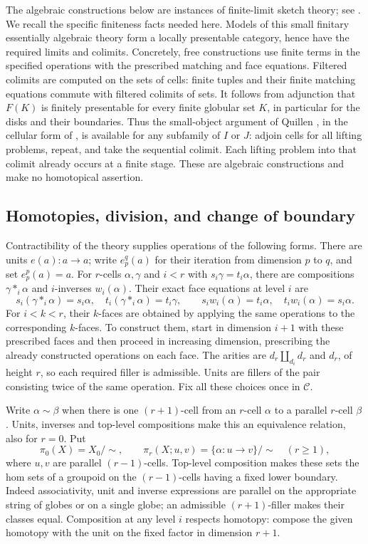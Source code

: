 \documentclass[11pt,letterpaper]{article}
\numberwithin{equation}{section}
\theoremstyle{plain}
\theoremstyle{definition}
\theoremstyle{remark}
\begin{document}
The algebraic constructions below are instances of finite-limit sketch
theory; see \cite[Section~4.4, Theorems~1, 2 and~4]{BarrWells1985}.
We recall the specific finiteness facts needed here.  Models of this small
finitary essentially algebraic theory form a locally presentable
category, hence have the required limits and colimits.  Concretely,
free constructions use finite terms in the specified operations with
the prescribed matching and face equations.  Filtered colimits are
computed on the sets of cells: finite tuples and their finite matching
equations commute with filtered colimits of sets.  It follows from
adjunction that $F(K)$ is finitely presentable for every finite globular
set $K$, in particular for the disks and their boundaries.  Thus the
small-object argument of Quillen \cite{Quillen1967}, in the cellular
form of \cite[Theorem~2.1.14 and Corollary~2.1.15]{Hovey1999}, is
available for any subfamily of $I$ or $J$: adjoin cells for all lifting
problems, repeat, and take the
sequential colimit.  Each lifting problem into that colimit already
occurs at a finite stage.  These are algebraic constructions and make
no homotopical assertion.

\subsection{Homotopies, division, and change of boundary}

Contractibility of the theory supplies operations of the following
forms.  There are units $e(a):a\to a$; write $e_p^q(a)$ for their
iteration from dimension $p$ to $q$, and set $e_p^p(a)=a$.  For
$r$-cells $\alpha,\gamma$ and $i<r$ with $s_i\gamma=t_i\alpha$,
there are compositions $\gamma*_i\alpha$ and $i$-inverses
$w_i(\alpha)$.  Their exact face equations at level $i$ are
\[
 s_i(\gamma*_i\alpha)=s_i\alpha,\quad
 t_i(\gamma*_i\alpha)=t_i\gamma,\qquad
 s_iw_i(\alpha)=t_i\alpha,\quad t_iw_i(\alpha)=s_i\alpha.
\]
For $i<k<r$, their $k$-faces are obtained by applying the same
operations to the corresponding $k$-faces.  To construct them, start
in dimension $i+1$ with these prescribed faces and then proceed in
increasing dimension, prescribing the already constructed operations
on each face.  The arities are $d_r\amalg_{d_i}d_r$ and $d_r$, of
height $r$, so each required filler is admissible.  Units are fillers
of the pair consisting twice of the same operation.  Fix all these
choices once in $\mathcal C$.

Write $\alpha\sim\beta$ when there is one $(r+1)$-cell from an
$r$-cell $\alpha$ to a parallel $r$-cell $\beta$.  Units, inverses and
top-level compositions make this an equivalence relation, also for
$r=0$.  Put
\[
 \pi_0(X)=X_0/{\sim},\qquad
 \pi_r(X;u,v)=\{\alpha:u\to v\}/{\sim}\quad(r\ge1),
\]
where $u,v$ are parallel $(r-1)$-cells.  Top-level composition makes
these sets the hom sets of a groupoid on the $(r-1)$-cells having a
fixed lower boundary.  Indeed associativity, unit and inverse
expressions are parallel on the appropriate string of globes or on
a single globe; an admissible $(r+1)$-filler makes their classes equal.
Composition at any level $i$ respects homotopy: compose the given
homotopy with the unit on the fixed factor in dimension $r+1$.
\end{document}
